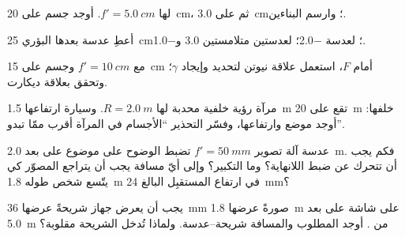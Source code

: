 \begin{exercise}[$\star$]\label{exo:b1:mirrors-thin-lenses:2}
 لها $f' = \qty{5.0}{cm}$. أوجد  جسم
على \qty{20}{cm}، ثم على \qty{3.0}{cm}؛ وارسم البناءين.
\end{exercise}

\begin{exercise}[$\star$]\label{exo:b1:mirrors-thin-lenses:3}
أعطِ  عدسة بعدها البؤري \qty{25}{cm}؛ 
لعدسة \qty{-2.0}{\delta}؛  لعدستين متلامستين
\qty{+3.0}{\delta} و\qty{-1.0}{\delta}.
\end{exercise}

\begin{exercise}[$\star$]\label{exo:b1:mirrors-thin-lenses:4}
مع $f' = \qty{10}{cm}$ وجسم على \qty{15}{cm} أمام $F$،
استعمل علاقة نيوتن لتحديد  وإيجاد $\gamma$؛ وتحقق
بعلاقة ديكارت.
\end{exercise}

\begin{exercise}[$\star\star$]\label{exo:b1:mirrors-thin-lenses:5}
مرآة رؤية خلفية محدبة لها $R = \qty{2.0}{m}$. وسيارة ارتفاعها \qty{1.5}{m}
تقع على \qty{20}{m} خلفها: أوجد موضع  وارتفاعها،
وفسّر التحذير ``الأجسام في المرآة أقرب ممّا تبدو''.
\end{exercise}

\begin{exercise}[$\star\star$]\label{exo:b1:mirrors-thin-lenses:6}
عدسة آلة تصوير $f' = \qty{50}{mm}$ تضبط الوضوح على موضوع على بعد
\qty{2.0}{m}. فكم يجب أن تتحرك  عن ضبط اللانهاية؟ وما
التكبير؟ وإلى أيّ مسافة يجب أن يتراجع المصوّر كي يتّسع
شخص طوله \qty{1.8}{m} في ارتفاع المستقبِل البالغ \qty{24}{mm}؟
\end{exercise}

\begin{exercise}[$\star\star$]\label{exo:b1:mirrors-thin-lenses:7}
يجب أن يعرض جهاز شريحةً عرضها \qty{36}{mm} صورةً عرضها \qty{1.8}{m}
على شاشة على بعد \qty{5.0}{m} من . أوجد 
المطلوب والمسافة شريحة--عدسة. ولماذا تُدخل الشريحة مقلوبة؟
\end{exercise}

